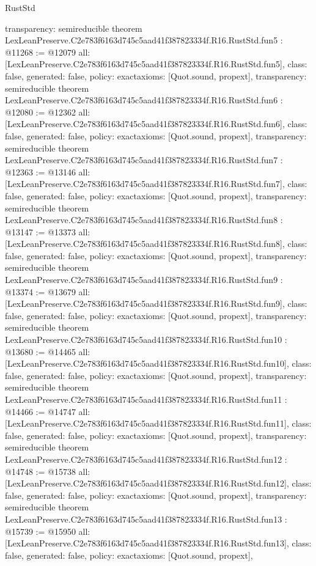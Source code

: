 \begin{lexlean}{RustStd}
\begin{coremodule}
{  transparency: semireducible
}
theorem LexLeanPreserve.C2e783f6163d745c5aad41f387823334f.R16.RustStd.fun5 : @11268 := @12079 {
  all: [LexLeanPreserve.C2e783f6163d745c5aad41f387823334f.R16.RustStd.fun5],
  class: false,
  generated: false,
  policy: exact{axioms: [Quot.sound, propext]},
  transparency: semireducible
}
theorem LexLeanPreserve.C2e783f6163d745c5aad41f387823334f.R16.RustStd.fun6 : @12080 := @12362 {
  all: [LexLeanPreserve.C2e783f6163d745c5aad41f387823334f.R16.RustStd.fun6],
  class: false,
  generated: false,
  policy: exact{axioms: [Quot.sound, propext]},
  transparency: semireducible
}
theorem LexLeanPreserve.C2e783f6163d745c5aad41f387823334f.R16.RustStd.fun7 : @12363 := @13146 {
  all: [LexLeanPreserve.C2e783f6163d745c5aad41f387823334f.R16.RustStd.fun7],
  class: false,
  generated: false,
  policy: exact{axioms: [Quot.sound, propext]},
  transparency: semireducible
}
theorem LexLeanPreserve.C2e783f6163d745c5aad41f387823334f.R16.RustStd.fun8 : @13147 := @13373 {
  all: [LexLeanPreserve.C2e783f6163d745c5aad41f387823334f.R16.RustStd.fun8],
  class: false,
  generated: false,
  policy: exact{axioms: [Quot.sound, propext]},
  transparency: semireducible
}
theorem LexLeanPreserve.C2e783f6163d745c5aad41f387823334f.R16.RustStd.fun9 : @13374 := @13679 {
  all: [LexLeanPreserve.C2e783f6163d745c5aad41f387823334f.R16.RustStd.fun9],
  class: false,
  generated: false,
  policy: exact{axioms: [Quot.sound, propext]},
  transparency: semireducible
}
theorem LexLeanPreserve.C2e783f6163d745c5aad41f387823334f.R16.RustStd.fun10 : @13680 := @14465 {
  all: [LexLeanPreserve.C2e783f6163d745c5aad41f387823334f.R16.RustStd.fun10],
  class: false,
  generated: false,
  policy: exact{axioms: [Quot.sound, propext]},
  transparency: semireducible
}
theorem LexLeanPreserve.C2e783f6163d745c5aad41f387823334f.R16.RustStd.fun11 : @14466 := @14747 {
  all: [LexLeanPreserve.C2e783f6163d745c5aad41f387823334f.R16.RustStd.fun11],
  class: false,
  generated: false,
  policy: exact{axioms: [Quot.sound, propext]},
  transparency: semireducible
}
theorem LexLeanPreserve.C2e783f6163d745c5aad41f387823334f.R16.RustStd.fun12 : @14748 := @15738 {
  all: [LexLeanPreserve.C2e783f6163d745c5aad41f387823334f.R16.RustStd.fun12],
  class: false,
  generated: false,
  policy: exact{axioms: [Quot.sound, propext]},
  transparency: semireducible
}
theorem LexLeanPreserve.C2e783f6163d745c5aad41f387823334f.R16.RustStd.fun13 : @15739 := @15950 {
  all: [LexLeanPreserve.C2e783f6163d745c5aad41f387823334f.R16.RustStd.fun13],
  class: false,
  generated: false,
  policy: exact{axioms: [Quot.sound, propext]},
}
\end{coremodule}
\end{lexlean}
